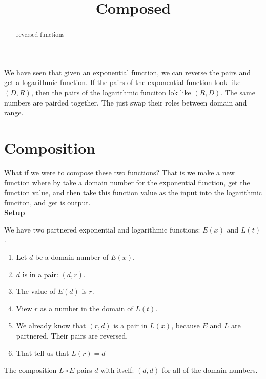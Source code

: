 \documentclass{ximera}
\title{Composed}
\begin{document}
\begin{abstract}
reversed functions
\end{abstract}
\maketitle







We have seen that given an exponential function, we can reverse the pairs and get a logarithmic function.  If the pairs of the exponential function look like $(D,R)$, then the pairs of the logarithmic funciton lok like $(R,D)$.  The same numbers are pairded together.  The just swap their roles between domain and range.

\section{Composition}

What if we were to compose these two functions?  That is we make a new function where by take a domain number for the exponential function, get the function value, and then take this function value as the input into the logarithmic funciton, and get is output. \\





\textbf{Setup}

We have two partnered exponential and logarithmic functions: $E(x)$ and $L(t)$.  \\

\begin{enumerate}
\item Let $d$ be a domain number of $E(x)$.
\item $d$ is in a pair: $(d, r)$.
\item The value of $E(d)$ is $r$.
\item View $r$ as a number in the domain of $L(t)$.
\item We already know that $(r,d)$ is a pair in $L(x)$, because $E$ and $L$ are partnered.  Their pairs are reversed.
\item That tell us that $L(r)=d$
\end{enumerate}


The composition $L \circ E$ pairs $d$ with itself: $(d,d)$ for all of the domain numbers. \\
\end{document}
